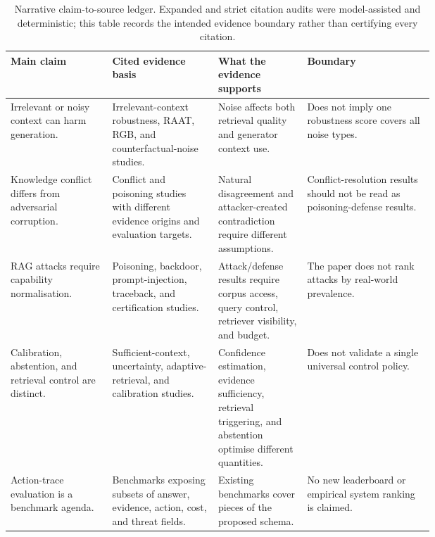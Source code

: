 \begin{table}[t]
\centering
\scriptsize
\renewcommand{\arraystretch}{0.9}
\begin{tabularx}{\linewidth}{>{\raggedright\arraybackslash}p{0.24\linewidth}>{\raggedright\arraybackslash}p{0.25\linewidth}>{\raggedright\arraybackslash}p{0.21\linewidth}X}
\toprule
\textbf{Main claim} & \textbf{Cited evidence basis} & \textbf{What the evidence supports} & \textbf{Boundary} \\
\midrule
Irrelevant or noisy context can harm generation. & Irrelevant-context robustness, RAAT, RGB, and counterfactual-noise studies. & Noise affects both retrieval quality and generator context use. & Does not imply one robustness score covers all noise types. \\
Knowledge conflict differs from adversarial corruption. & Conflict and poisoning studies with different evidence origins and evaluation targets. & Natural disagreement and attacker-created contradiction require different assumptions. & Conflict-resolution results should not be read as poisoning-defense results. \\
RAG attacks require capability normalisation. & Poisoning, backdoor, prompt-injection, traceback, and certification studies. & Attack/defense results require corpus access, query control, retriever visibility, and budget. & The paper does not rank attacks by real-world prevalence. \\
Calibration, abstention, and retrieval control are distinct. & Sufficient-context, uncertainty, adaptive-retrieval, and calibration studies. & Confidence estimation, evidence sufficiency, retrieval triggering, and abstention optimise different quantities. & Does not validate a single universal control policy. \\
Action-trace evaluation is a benchmark agenda. & Benchmarks exposing subsets of answer, evidence, action, cost, and threat fields. & Existing benchmarks cover pieces of the proposed schema. & No new leaderboard or empirical system ranking is claimed. \\
\bottomrule
\end{tabularx}
\caption{Narrative claim-to-source ledger. Expanded and strict citation audits
were model-assisted and deterministic; this table records the intended evidence
boundary rather than certifying every citation.}
\label{tab:claim-verification-ledger}
\end{table}
